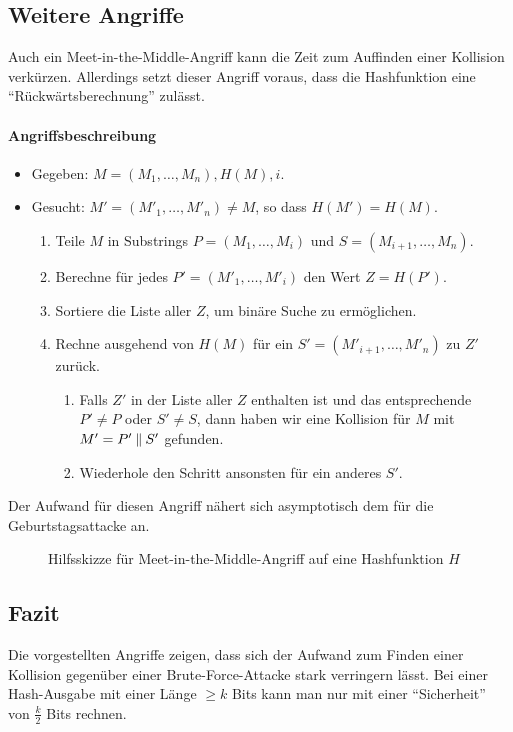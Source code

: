 \subsection{Weitere Angriffe}
Auch ein Meet-in-the-Middle-Angriff \indexMeetInTheMiddle kann die Zeit
zum Auffinden einer Kollision verkürzen. Allerdings setzt dieser Angriff
voraus, dass die Hashfunktion eine "`Rückwärtsberechnung"' zulässt.
\paragraph*{Angriffsbeschreibung}
\begin{itemize}
\item Gegeben: $M = (M_1,\dots,M_n), H(M), i$.
\item Gesucht: $M' = (M'_1,\dots,M'_n) \neq M$, so dass $H(M') = H(M)$.
  \begin{enumerate}
  \item Teile $M$ in Substrings $P = (M_1,\dots,M_i)$ und $S = (M_{i+1},\dots,M_{n})$.
  \item Berechne für jedes $P' = (M'_1,\dots,M'_i)$ den Wert $Z = H(P')$.
  \item Sortiere die Liste aller $Z$, um binäre Suche zu ermöglichen.
  \item Rechne ausgehend von $H(M)$ für ein $S' =
    (M'_{i+1},\dots,M'_{n})$ zu $Z'$ zurück. 
    \begin{enumerate}
    \item Falls $Z'$ in der Liste aller $Z$ enthalten ist und das
      entsprechende $P' \neq P$ oder $S' \neq S$, dann haben wir eine
      Kollision für $M$ mit $M' = P' \mathbin{\|} S'$ gefunden. 
    \item Wiederhole den Schritt ansonsten für ein anderes $S'$.
    \end{enumerate}
  \end{enumerate}
\end{itemize}
Der Aufwand für diesen Angriff nähert sich asymptotisch dem für die
Geburtstagsattacke an. 

\begin{figure}[h]
  \centering
  \caption{Hilfsskizze für Meet-in-the-Middle-Angriff auf eine Hashfunktion $H$}
  \label{fig:md-meet-in-the-middle-attack}
\end{figure}
\subsection{Fazit}
Die vorgestellten Angriffe zeigen, dass sich der Aufwand zum Finden
einer Kollision gegenüber einer Brute-Force-Attacke stark verringern
lässt. Bei einer Hash-Ausgabe mit einer Länge $\geq k$ Bits kann man nur
mit einer "`Sicherheit"' von $\frac{k}{2}$ Bits rechnen.
